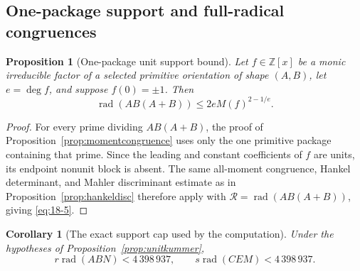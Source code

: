 \documentclass[11pt]{article}
\numberwithin{equation}{section}
\newtheorem{proposition}[theorem]{Proposition}
\newtheorem{corollary}[theorem]{Corollary}
\theoremstyle{definition}
\newcommand{\Z}{\mathbb Z}
\begin{document}
\subsection{One-package support and full-radical congruences}

\begin{proposition}[One-package unit support bound]
\label{prop:onepackagesupport}
Let \(f\in\Z[x]\) be a monic irreducible factor of a selected primitive
orientation of shape \((A,B)\), let \(e=\deg f\), and suppose
\(f(0)=\pm1\).  Then
\begin{equation}
 \operatorname{rad}(AB(A+B))
 \leq2eM(f)^{2-1/e}.
 \label{eq:18-5}
\end{equation}
\end{proposition}

\begin{proof}
For every prime dividing \(AB(A+B)\), the proof of
Proposition~\ref{prop:momentcongruence} uses only the one primitive package
containing that prime.  Since the leading and constant coefficients of \(f\)
are units, its endpoint nonunit block is absent.  The same all-moment
congruence, Hankel determinant, and Mahler discriminant estimate as in
Proposition~\ref{prop:hankeldisc} therefore apply with
\(\mathcal R=\operatorname{rad}(AB(A+B))\), giving \eqref{eq:18-5}.
\end{proof}

\begin{corollary}[The exact support cap used by the computation]
\label{cor:unitsupportcap}
Under the hypotheses of Proposition~\ref{prop:unitkummer},
\begin{equation}
 r\operatorname{rad}(ABN)<4\,398\,937,
 \qquad
 s\operatorname{rad}(CEM)<4\,398\,937.
 \label{eq:18-6}
\end{equation}
\end{corollary}
\end{document}
